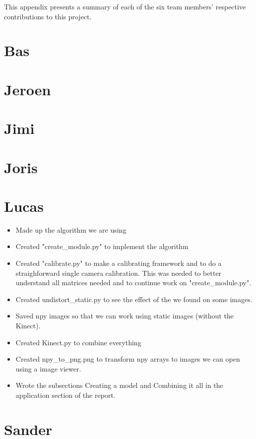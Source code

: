 This appendix presents a summary of each of the six team members' respective
contributions to this project.


\section{Bas}


\section{Jeroen}


\section{Jimi}


\section{Joris}


\section{Lucas}
\begin{itemize}
\item Made up the algorithm we are using
\item Created "create\_module.py" to implement the algorithm
\item Created "calibrate.py" to make a calibrating framework and to do a 
straighforward single camera calibration. This was needed to better understand 
all matrices needed and to continue work on "create\_module.py".
\item Created undistort\_static.py to see the effect of the we found on some images.
\item Saved npy images so that we can work using static images (without the Kinect).
\item Created Kinect.py to combine everything
\item Created npy\_to\_png.png to transform npy arrays to images we can open 
using a image viewer.
\item Wrote the subsections Creating a model and Combining it all in the 
application section of the report.
\end{itemize}
\section{Sander}

